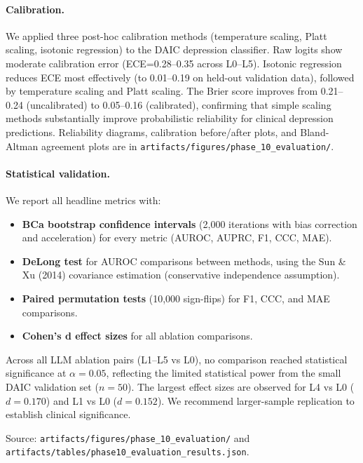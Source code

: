 \documentclass[12pt,oneside]{book}
\begin{document}
\begin{itemize}
\paragraph{Calibration.} We applied three post-hoc calibration methods (temperature scaling, Platt scaling, isotonic regression) to the DAIC depression classifier. Raw logits show moderate calibration error (ECE=0.28--0.35 across L0--L5). Isotonic regression reduces ECE most effectively (to 0.01--0.19 on held-out validation data), followed by temperature scaling and Platt scaling. The Brier score improves from 0.21--0.24 (uncalibrated) to 0.05--0.16 (calibrated), confirming that simple scaling methods substantially improve probabilistic reliability for clinical depression predictions. Reliability diagrams, calibration before/after plots, and Bland-Altman agreement plots are in \texttt{artifacts/figures/phase\_10\_evaluation/}.

\paragraph{Statistical validation.} We report all headline metrics with:
\begin{itemize}
    \item \textbf{BCa bootstrap confidence intervals} (2,000 iterations with bias correction and acceleration) for every metric (AUROC, AUPRC, F1, CCC, MAE).
    \item \textbf{DeLong test} for AUROC comparisons between methods, using the Sun \& Xu (2014) covariance estimation (conservative independence assumption).
    \item \textbf{Paired permutation tests} (10,000 sign-flips) for F1, CCC, and MAE comparisons.
    \item \textbf{Cohen's d effect sizes} for all ablation comparisons.
\end{itemize}

Across all LLM ablation pairs (L1--L5 vs L0), no comparison reached statistical significance at $\alpha=0.05$, reflecting the limited statistical power from the small DAIC validation set ($n=50$). The largest effect sizes are observed for L4 vs L0 ($d=0.170$) and L1 vs L0 ($d=0.152$). We recommend larger-sample replication to establish clinical significance.

Source: \texttt{artifacts/figures/phase\_10\_evaluation/} and \texttt{artifacts/tables/phase10\_evaluation\_results.json}.


\end{itemize}
\end{document}
